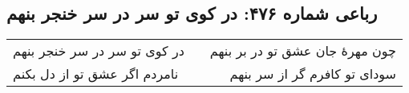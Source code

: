 \begin{center}
\section*{رباعی شماره ۴۷۶: در کوی تو سر در سر خنجر بنهم}
\label{sec:sh476}
\begin{longtable}{l p{0.5cm} r}
در کوی تو سر در سر خنجر بنهم
&&
چون مهرهٔ جان عشق تو در بر بنهم
\\
نامردم اگر عشق تو از دل بکنم
&&
سودای تو کافرم گر از سر بنهم
\\
\end{longtable}
\end{center}
